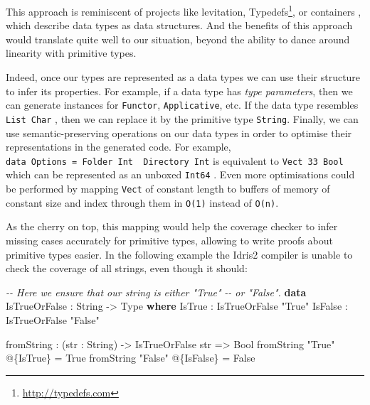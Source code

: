 \documentclass[
]{article}
\newenvironment{Shaded}{}{}
\newcommand{\CommentTok}[1]{\textcolor[rgb]{0.38,0.63,0.69}{\textit{#1}}}
\newcommand{\DataTypeTok}[1]{\textcolor[rgb]{0.56,0.13,0.00}{#1}}
\newcommand{\KeywordTok}[1]{\textcolor[rgb]{0.00,0.44,0.13}{\textbf{#1}}}
\newcommand{\NormalTok}[1]{#1}
\newcommand{\OperatorTok}[1]{\textcolor[rgb]{0.40,0.40,0.40}{#1}}
\newcommand{\OtherTok}[1]{\textcolor[rgb]{0.00,0.44,0.13}{#1}}
\newcommand{\StringTok}[1]{\textcolor[rgb]{0.25,0.44,0.63}{#1}}
\begin{document}
This approach is reminiscent of projects like
levitation\cite{levitation}, Typedefs\footnote{\url{http://typedefs.com}},
or containers\cite{indexed_containers} , which describe data types as
data structures. And the benefits of this approach would translate quite
well to our situation, beyond the ability to dance around linearity with
primitive types.

Indeed, once our types are represented as a data types we can use their
structure to infer its properties. For example, if a data type has
\emph{type parameters}, then we can generate instances for
\texttt{Functor}, \texttt{Applicative}, etc. If the data type resembles
\texttt{List\ Char} , then we can replace it by the primitive type
\texttt{String}. Finally, we can use semantic-preserving operations on
our data types in order to optimise their representations in the
generated code. For example,
\texttt{data\ Options\ =\ Folder\ Int\ \textbar{}\ Directory\ Int} is
equivalent to \texttt{Vect\ 33\ Bool} which can be represented as an
unboxed \texttt{Int64} . Even more optimisations could be performed by
mapping \texttt{Vect} of constant length to buffers of memory of
constant size and index through them in \texttt{O(1)} instead of
\texttt{O(n)}.

As the cherry on top, this mapping would help the coverage checker to
infer missing cases accurately for primitive types, allowing to write
proofs about primitive types easier. In the following example the Idris2
compiler is unable to check the coverage of all strings, even though it
should:

\begin{Shaded}
\begin{Highlighting}[]
\CommentTok{{-}{-} Here we ensure that our string is either "True"}
\CommentTok{{-}{-} or "False".}
\KeywordTok{data} \DataTypeTok{IsTrueOrFalse} \OperatorTok{:} \DataTypeTok{String} \OtherTok{{-}\textgreater{}} \DataTypeTok{Type} \KeywordTok{where}
  \DataTypeTok{IsTrue} \OperatorTok{:} \DataTypeTok{IsTrueOrFalse} \StringTok{"True"}
  \DataTypeTok{IsFalse} \OperatorTok{:} \DataTypeTok{IsTrueOrFalse} \StringTok{"False"}

\NormalTok{fromString }\OperatorTok{:}\NormalTok{ (str }\OperatorTok{:} \DataTypeTok{String}\NormalTok{) }\OtherTok{{-}\textgreater{}} \DataTypeTok{IsTrueOrFalse}\NormalTok{ str }\OtherTok{=\textgreater{}} \DataTypeTok{Bool}
\NormalTok{fromString }\StringTok{"True"} \OperatorTok{@}\NormalTok{\{}\DataTypeTok{IsTrue}\NormalTok{\} }\OtherTok{=} \DataTypeTok{True}
\NormalTok{fromString }\StringTok{"False"} \OperatorTok{@}\NormalTok{\{}\DataTypeTok{IsFalse}\NormalTok{\} }\OtherTok{=} \DataTypeTok{False}
\end{Highlighting}
\end{Shaded}
\end{document}
